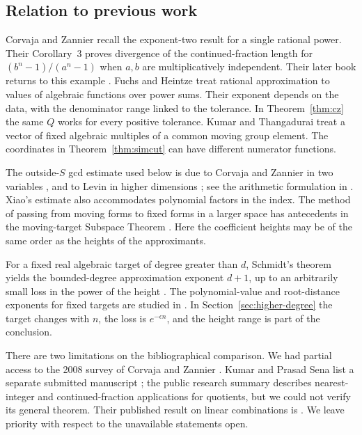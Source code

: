 \documentclass[11pt,a4paper,reqno]{amsart}
\theoremstyle{definition}
\theoremstyle{remark}
\numberwithin{equation}{section}
\begin{document}
\subsection*{Relation to previous work}
Corvaja and Zannier \cite[p.~738]{CZ05} recall the exponent-two result for a single rational power. Their Corollary~3 proves divergence of the continued-fraction length for \((b^n-1)/(a^n-1)\) when \(a,b\) are multiplicatively independent. Their later book returns to this example \cite[Exercise~4.47, pp.~165--166]{CZ18}. Fuchs and Heintze \cite[Theorems~2.1 and~2.6]{FH} treat rational approximation to values of algebraic functions over power sums. Their exponent depends on the data, with the denominator range linked to the tolerance. In Theorem~\ref{thm:cz} the same \(Q\) works for every positive tolerance. Kumar and Thangadurai \cite[Theorem~1.1]{KT} treat a vector of fixed algebraic multiples of a common moving group element. The coordinates in Theorem~\ref{thm:simcut} can have different numerator functions.

The outside-\(S\) gcd estimate used below is due to Corvaja and Zannier in two variables \cite{CZgcd}, and to Levin in higher dimensions \cite{Levin}; see the arithmetic formulation in \cite[Theorem~1.13(a)]{LW}. Xiao's estimate \cite{Xiao} also accommodates polynomial factors in the index. The method of passing from moving forms to fixed forms in a larger space has antecedents in the moving-target Subspace Theorem \cite{RV}. Here the coefficient heights may be of the same order as the heights of the approximants.

For a fixed real algebraic target of degree greater than \(d\), Schmidt's theorem yields the bounded-degree approximation exponent \(d+1\), up to an arbitrarily small loss in the power of the height \cite{Schmidt70}. The polynomial-value and root-distance exponents for fixed targets are studied in \cite{Wirsing,BE}. In Section~\ref{sec:higher-degree} the target changes with \(n\), the loss is \(e^{-\epsilon n}\), and the height range is part of the conclusion.

There are two limitations on the bibliographical comparison. We had partial access to the 2008 survey of Corvaja and Zannier \cite{CZ08}. Kumar and Prasad Sena list a separate submitted manuscript \cite{KPsub}; the public research summary \cite[p.~59]{HRI} describes nearest-integer and continued-fraction applications for quotients, but we could not verify its general theorem. Their published result on linear combinations is \cite[Theorem~1.3]{KP}. We leave priority with respect to the unavailable statements open.
\end{document}
